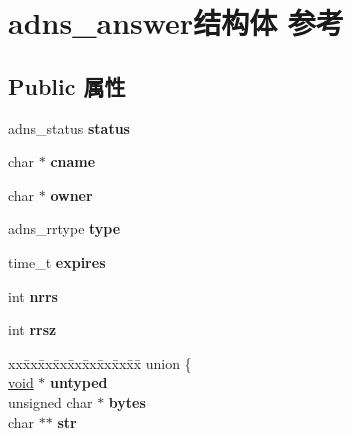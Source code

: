 \hypertarget{structadns__answer}{}\section{adns\+\_\+answer结构体 参考}
\label{structadns__answer}
\subsection*{Public 属性}
\begin{DoxyCompactItemize}
\item 
\mbox{\label{structadns__answer_a87abe883c37853849a897cf90b03a519}} 
adns\+\_\+status {\bfseries status}
\item 
\mbox{\label{structadns__answer_ac929c033c9e655ecb8bed029cc6c464b}} 
char $\ast$ {\bfseries cname}
\item 
\mbox{\label{structadns__answer_ad5355adfa9597cab497d8995ac415c5f}} 
char $\ast$ {\bfseries owner}
\item 
\mbox{\label{structadns__answer_aa02356555226290bb640ad9d236a4d22}} 
adns\+\_\+rrtype {\bfseries type}
\item 
\mbox{\label{structadns__answer_a628814a099726e0860568245d9f421b3}} 
time\+\_\+t {\bfseries expires}
\item 
\mbox{\label{structadns__answer_a2c16f641fa930447085df0d766d44e10}} 
int {\bfseries nrrs}
\item 
\mbox{\label{structadns__answer_a63adde622e406f367293a40d515ba504}} 
int {\bfseries rrsz}
\item 
\mbox{\label{structadns__answer_a4df80c4f3be54896ede5c306bd551197}} 
\begin{tabbing}
xx\=xx\=xx\=xx\=xx\=xx\=xx\=xx\=xx\=\kill
union \{\\
\>\hyperlink{interfacevoid}{void} $\ast$ {\bfseries untyped}\\
\>unsigned char $\ast$ {\bfseries bytes}\\
\>char $\ast$$\ast$ {\bfseries str}\\
$$
\end{tabbing}
\end{DoxyCompactItemize}
